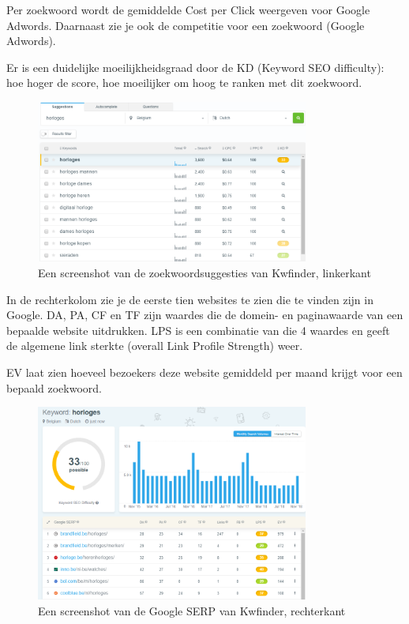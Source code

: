 Per zoekwoord wordt de gemiddelde Cost per Click weergeven voor Google Adwords. Daarnaast zie je ook de competitie voor een zoekwoord (Google Adwords). 

Er is een duidelijke moeilijkheidsgraad door de KD (Keyword SEO difficulty): hoe hoger de score, hoe moeilijker om hoog te ranken met dit zoekwoord. 

\begin{figure}[h!]
\centering
\includegraphics[width=0.8\textwidth]{img/kwfinderlinks.PNG}
\caption{Een screenshot van de zoekwoordsuggesties van Kwfinder, linkerkant \autocite{kwfinder}}
\end{figure}

In de rechterkolom zie je de eerste tien websites te zien die te vinden zijn in Google. DA, PA, CF en TF zijn waardes die de domein- en paginawaarde van een bepaalde website uitdrukken. LPS is een combinatie van die 4 waardes en geeft de algemene link sterkte (overall Link Profile Strength) weer. 

EV laat zien hoeveel bezoekers deze website gemiddeld per maand krijgt voor een bepaald zoekwoord. 

\begin{figure}[h!]
\centering
\includegraphics[width=0.8\textwidth]{img/kwfinderrechts.PNG}
\caption{Een screenshot van de Google SERP van Kwfinder, rechterkant \autocite{kwfinder}}
\end{figure}

